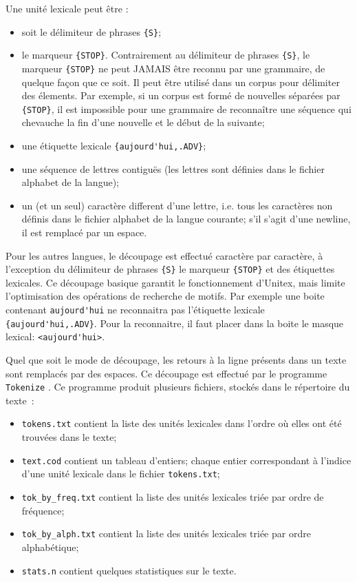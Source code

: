 \bigskip
\noindent Une unité lexicale peut être :
\begin{itemize}
  \item soit le délimiteur de phrases \verb+{S}+;
  \item le marqueur \verb+{STOP}+. Contrairement au délimiteur de phrases
  \verb+{S}+, le marqueur \verb+{STOP}+ ne peut JAMAIS être reconnu par une grammaire, de quelque
  façon que ce soit. Il peut être utilisé dans un corpus pour délimiter des élements. Par exemple,
  si un corpus est formé de nouvelles séparées par \verb+{STOP}+, il est impossible pour une
  grammaire de reconnaître une séquence qui chevauche la fin d'une nouvelle et le début de la
  suivante;
  \item une étiquette lexicale \verb+{aujourd'hui,.ADV}+;
  \item une séquence de lettres contiguës (les lettres sont définies dans le fichier alphabet de la
  langue);
  \item un (et un seul) caractère different d'une lettre, i.e. tous les caractères non définis
  dans le fichier alphabet de la langue courante; s'il s'agit d'une newline, il est remplacé par un
  espace.
\end{itemize}

\bigskip
\noindent Pour les autres langues, le découpage est effectué caractère par caractère, à l’exception
du délimiteur de phrases \verb+{S}+ le marqueur \verb+{STOP}+ et des étiquettes lexicales. Ce
découpage basique garantit le fonctionnement d’Unitex, mais limite l’optimisation des opérations de
recherche de motifs. Par exemple une boite contenant \verb+aujourd'hui+ ne reconnaitra pas l'étiquette lexicale \verb+{aujourd'hui,.ADV}+. Pour la reconnaitre, il faut placer dans la boite le masque lexical: \verb+<aujourd'hui>+.


\bigskip
\noindent Quel que soit le mode de découpage, les retours à la ligne présents
dans un texte sont remplacés par des espaces. Ce découpage est effectué par le programme
\verb+Tokenize+ .
Ce programme produit plusieurs fichiers, stockés dans le répertoire du texte~:
\begin{itemize}
  \item \verb+tokens.txt+ contient la liste des unités lexicales dans l’ordre où elles ont été
  	  trouvées dans le texte;
  \item \verb+text.cod+  contient un tableau d’entiers; chaque entier correspondant à l’indice d’une
  	  unité lexicale dans le fichier \verb+tokens.txt+;
  \item \verb+tok_by_freq.txt+ contient la liste des unités lexicales triée par ordre de fréquence;
  \item \verb+tok_by_alph.txt+ contient la liste des unités lexicales triée par ordre alphabétique;
\item \verb+stats.n+ contient quelques statistiques sur le texte. 
\end{itemize}

